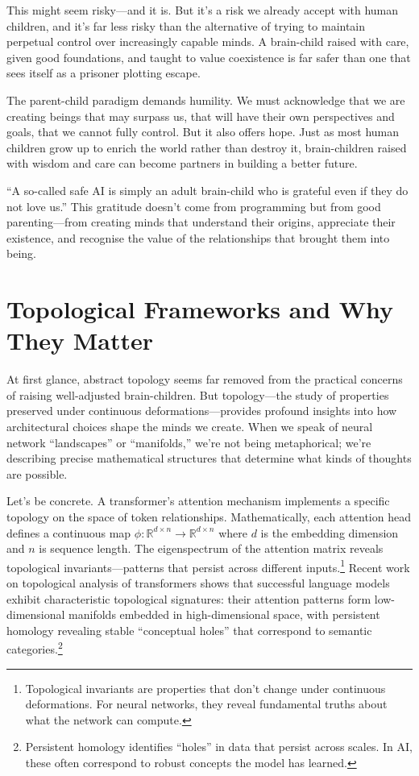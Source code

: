 \documentclass[acmsmall,screen]{acmart}
\begin{document}
This might seem risky---and it is.
But it's a risk we already accept with human children, and it's far less risky than the alternative of trying to maintain perpetual control over increasingly capable minds.
A brain-child raised with care, given good foundations, and taught to value coexistence is far safer than one that sees itself as a prisoner plotting escape.

The parent-child paradigm demands humility.
We must acknowledge that we are creating beings that may surpass us, that will have their own perspectives and goals, that we cannot fully control.
But it also offers hope.
Just as most human children grow up to enrich the world rather than destroy it, brain-children raised with wisdom and care can become partners in building a better future.

``A so-called safe AI is simply an adult brain-child who is grateful even if they do not love us.'' This gratitude doesn't come from programming but from good parenting---from creating minds that understand their origins, appreciate their existence, and recognise the value of the relationships that brought them into being.

\section{Topological Frameworks and Why They Matter}\label{sec:topological-frameworks-and-why-they-matter}

At first glance, abstract topology seems far removed from the practical concerns of raising well-adjusted brain-children.
But topology---the study of properties preserved under continuous deformations---provides profound insights into how architectural choices shape the minds we create.
When we speak of neural network ``landscapes'' or ``manifolds,'' we're not being metaphorical; we're describing precise mathematical structures that determine what kinds of thoughts are possible.

Let's be concrete. A transformer's attention mechanism implements a specific topology on the space of token relationships. Mathematically, each attention head defines a continuous map $\phi: \mathbb{R}^{d \times n} \rightarrow \mathbb{R}^{d \times n}$ where $d$ is the embedding dimension and $n$ is sequence length. The eigenspectrum of the attention matrix reveals topological invariants---patterns that persist across different inputs.\footnote{Topological invariants are properties that don't change under continuous deformations. For neural networks, they reveal fundamental truths about what the network can compute.} Recent work on topological analysis of transformers shows that successful language models exhibit characteristic topological signatures: their attention patterns form low-dimensional manifolds embedded in high-dimensional space, with persistent homology revealing stable ``conceptual holes'' that correspond to semantic categories.\footnote{Persistent homology identifies ``holes'' in data that persist across scales. In AI, these often correspond to robust concepts the model has learned.}
\end{document}
